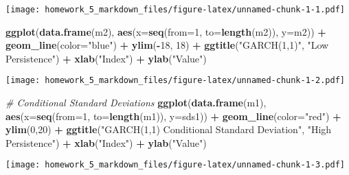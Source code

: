\documentclass[]{article}
\newenvironment{Shaded}{\begin{snugshade}}{\end{snugshade}}
\newcommand{\KeywordTok}[1]{\textcolor[rgb]{0.13,0.29,0.53}{\textbf{#1}}}
\newcommand{\DataTypeTok}[1]{\textcolor[rgb]{0.13,0.29,0.53}{#1}}
\newcommand{\DecValTok}[1]{\textcolor[rgb]{0.00,0.00,0.81}{#1}}
\newcommand{\StringTok}[1]{\textcolor[rgb]{0.31,0.60,0.02}{#1}}
\newcommand{\CommentTok}[1]{\textcolor[rgb]{0.56,0.35,0.01}{\textit{#1}}}
\newcommand{\OperatorTok}[1]{\textcolor[rgb]{0.81,0.36,0.00}{\textbf{#1}}}
\newcommand{\NormalTok}[1]{#1}
\begin{document}
\texttt{[image: homework\_5\_markdown\_files/figure-latex/unnamed-chunk-1-1.pdf]}

\begin{Shaded}
\begin{Highlighting}[]
\KeywordTok{ggplot}\NormalTok{(}\KeywordTok{data.frame}\NormalTok{(m2), }\KeywordTok{aes}\NormalTok{(}\DataTypeTok{x=}\KeywordTok{seq}\NormalTok{(}\DataTypeTok{from=}\DecValTok{1}\NormalTok{, }\DataTypeTok{to=}\KeywordTok{length}\NormalTok{(m2)), }\DataTypeTok{y=}\NormalTok{m2)) }\OperatorTok{+}
\StringTok{  }\KeywordTok{geom_line}\NormalTok{(}\DataTypeTok{color=}\StringTok{"blue"}\NormalTok{) }\OperatorTok{+}
\StringTok{  }\KeywordTok{ylim}\NormalTok{(}\OperatorTok{-}\DecValTok{18}\NormalTok{, }\DecValTok{18}\NormalTok{) }\OperatorTok{+}
\StringTok{  }\KeywordTok{ggtitle}\NormalTok{(}\StringTok{"GARCH(1,1)"}\NormalTok{, }\StringTok{"Low Persistence"}\NormalTok{) }\OperatorTok{+}
\StringTok{  }\KeywordTok{xlab}\NormalTok{(}\StringTok{"Index"}\NormalTok{) }\OperatorTok{+}
\StringTok{  }\KeywordTok{ylab}\NormalTok{(}\StringTok{"Value"}\NormalTok{)}
\end{Highlighting}
\end{Shaded}

\texttt{[image: homework\_5\_markdown\_files/figure-latex/unnamed-chunk-1-2.pdf]}

\begin{Shaded}
\begin{Highlighting}[]
\CommentTok{# Conditional Standard Deviations}
\KeywordTok{ggplot}\NormalTok{(}\KeywordTok{data.frame}\NormalTok{(m1), }\KeywordTok{aes}\NormalTok{(}\DataTypeTok{x=}\KeywordTok{seq}\NormalTok{(}\DataTypeTok{from=}\DecValTok{1}\NormalTok{, }\DataTypeTok{to=}\KeywordTok{length}\NormalTok{(m1)), }\DataTypeTok{y=}\NormalTok{sds1)) }\OperatorTok{+}
\StringTok{  }\KeywordTok{geom_line}\NormalTok{(}\DataTypeTok{color=}\StringTok{"red"}\NormalTok{) }\OperatorTok{+}
\StringTok{  }\KeywordTok{ylim}\NormalTok{(}\DecValTok{0}\NormalTok{,}\DecValTok{20}\NormalTok{) }\OperatorTok{+}
\StringTok{  }\KeywordTok{ggtitle}\NormalTok{(}\StringTok{"GARCH(1,1) Conditional Standard Deviation"}\NormalTok{, }\StringTok{"High Persistence"}\NormalTok{) }\OperatorTok{+}
\StringTok{  }\KeywordTok{xlab}\NormalTok{(}\StringTok{"Index"}\NormalTok{) }\OperatorTok{+}
\StringTok{  }\KeywordTok{ylab}\NormalTok{(}\StringTok{"Value"}\NormalTok{)}
\end{Highlighting}
\end{Shaded}

\texttt{[image: homework\_5\_markdown\_files/figure-latex/unnamed-chunk-1-3.pdf]}
\end{document}
